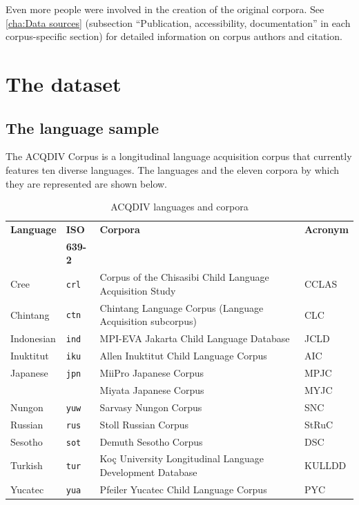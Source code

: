\documentclass[a4paper, 11pt]{book}
\begin{document}
Even more people were involved in the creation of the original corpora. See \autoref{cha:Data sources} (subsection “Publication, accessibility, documentation” in each corpus-specific section) for detailed information on corpus authors and citation. 


\chapter{The dataset}
\label{cha:Overview of the dataset}

\section{The language sample}
\label{sec:The language sample}

The ACQDIV Corpus is a longitudinal language acquisition corpus that currently features ten diverse languages. The languages and the eleven corpora by which they are represented are shown below. 

\begin{table}[ht!]
	\centering
	\begin{tabular}{llll}
		\toprule
			\textbf{Language} 	& \textbf{ISO} 		& \textbf{Corpora}  & \textbf{Acronym} \\
								& \textbf{639-2}	&					& \\
		\midrule
			Cree 		& \texttt{crl} 		 & Corpus of the Chisasibi Child Language Acquisition Study 	& CCLAS \\
			Chintang 	& \texttt{ctn}  	 & Chintang Language Corpus (Language Acquisition subcorpus) 	& CLC \\
			Indonesian 	& \texttt{ind}  	 & MPI-EVA Jakarta Child Language Database 						& JCLD \\
			Inuktitut 	& \texttt{iku}  	 & Allen Inuktitut Child Language Corpus 						& AIC \\
			Japanese 	& \texttt{jpn}  	 & MiiPro Japanese Corpus 										& MPJC \\
						&					 & Miyata Japanese Corpus 										& MYJC \\
			Nungon	 	& \texttt{yuw}  	 & Sarvasy Nungon Corpus 										& SNC \\
			Russian 	& \texttt{rus}  	 & Stoll Russian Corpus 										& StRuC \\
			Sesotho 	& \texttt{sot}  	 & Demuth Sesotho Corpus 										& DSC \\
			Turkish 	& \texttt{tur}  	 & Koç University Longitudinal Language Development Database 	& KULLDD \\
			Yucatec 	& \texttt{yua}  	 & Pfeiler Yucatec Child Language Corpus 						& PYC \\
		\bottomrule
	\end{tabular}
	\caption{ACQDIV languages and corpora}
	\label{tab:ACQDIV languages and corpora}
\end{table}
\end{document}
